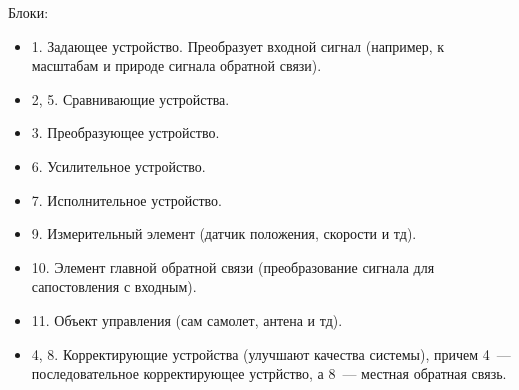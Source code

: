 Блоки:
\begin{itemize}
	\item 1. Задающее устройство. Преобразует входной сигнал (например, к масштабам и природе сигнала обратной связи).
	\item 2, 5. Сравнивающие устройства.
	\item 3. Преобразующее устройство.
	\item 6. Усилительное устройство.
	\item 7. Исполнительное устройство.
	\item 9. Измерительный элемент (датчик положения, скорости и тд).
	\item 10. Элемент главной обратной связи (преобразование сигнала для сапостовления с входным).
	\item 11. Объект управления (сам самолет, антена и тд).
	\item 4, 8. Корректирующие устройства (улучшают качества системы), причем 4~--- последовательное корректирующее устрйство, а 8~--- местная обратная связь.
\end{itemize}

